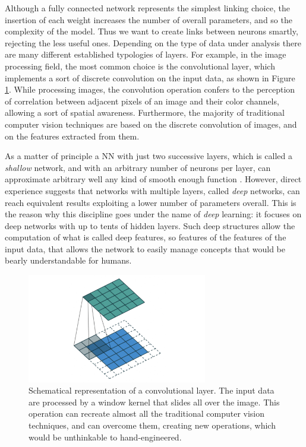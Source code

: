 Although a fully connected network represents the simplest linking choice, the insertion of each weight increases the number of overall parameters, and so the complexity of the model. Thus we want to create links between neurons smartly, rejecting the less useful ones. Depending on the type of data under analysis there are many different established typologies of layers. For example, in the image processing field, the most common choice is the convolutional layer, which implements a sort of discrete convolution on the input data, as shown in Figure \ref{fig:convolutional}. While processing images, the convolution operation confers to the perception of correlation between adjacent pixels of an image and their color channels, allowing a sort of spatial awareness. Furthermore, the majority of traditional computer vision techniques are based on the discrete convolution of images, and on the features extracted from them.

As a matter of principle a NN with just two successive layers, which is called a \textit{shallow} network, and with an arbitrary number of neurons per layer, can approximate arbitrary well any kind of smooth enough function \cite{pinkus_1999}. However, direct experience suggests that networks with multiple layers, called \textit{deep} networks, can reach equivalent results exploiting a lower number of parameters overall. This is the reason why this discipline goes under the name of \textit{deep} learning: it focuses on deep networks with up to tents of hidden layers. Such deep structures allow the computation of what is called deep features, so features of the features of the input data, that allows the network to easily manage concepts that would be bearly understandable for humans.

\begin{figure}
    \centering
    \includegraphics[width = 0.7\textwidth]{images/CL}
    \caption{Schematical representation of a convolutional layer. The input data are processed by a window kernel that slides all over the image. This operation can recreate almost all the traditional computer vision techniques, and can overcome them, creating new operations, which would be unthinkable to hand-engineered.}
    \label{fig:convolutional}
\end{figure}

